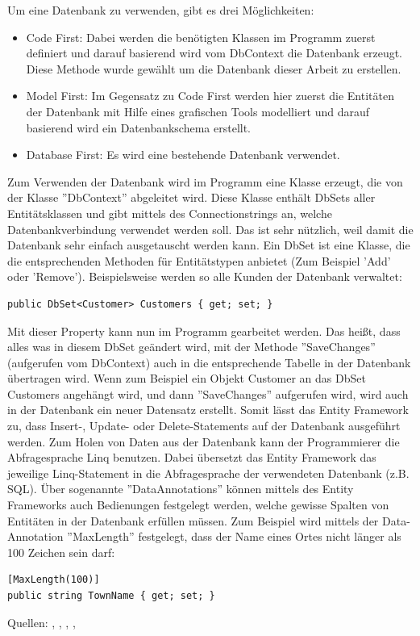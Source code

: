 Um eine Datenbank zu verwenden, gibt es drei Möglichkeiten:
\begin{itemize}
\item Code First: Dabei werden die benötigten Klassen im Programm zuerst definiert und darauf basierend wird vom DbContext die Datenbank erzeugt. Diese Methode wurde gewählt um die Datenbank dieser Arbeit zu erstellen.
\item Model First: Im Gegensatz zu Code First werden hier zuerst die Entitäten der Datenbank mit Hilfe eines grafischen Tools modelliert und darauf basierend wird ein Datenbankschema erstellt.
\item Database First: Es wird eine bestehende Datenbank verwendet.
\end{itemize}
Zum Verwenden der Datenbank wird im Programm eine Klasse erzeugt, die von der Klasse ''DbContext'' abgeleitet wird. Diese Klasse enthält DbSets aller Entitätsklassen und gibt mittels des Connectionstrings an, welche Datenbankverbindung verwendet werden soll. Das ist sehr nützlich, weil damit die Datenbank sehr einfach ausgetauscht werden kann. Ein DbSet ist eine Klasse, die die entsprechenden Methoden für Entitätstypen anbietet (Zum Beispiel 'Add' oder 'Remove'). \newline Beispielsweise werden so alle Kunden der Datenbank verwaltet: 
\begin{lstlisting}
public DbSet<Customer> Customers { get; set; }
\end{lstlisting}
Mit dieser Property kann nun im Programm gearbeitet werden. Das heißt, dass alles was in diesem DbSet geändert wird, mit der Methode ''SaveChanges'' (aufgerufen vom  DbContext) auch in die entsprechende Tabelle in der Datenbank übertragen wird. Wenn zum Beispiel ein Objekt Customer an das DbSet Customers angehängt wird, und dann ''SaveChanges'' aufgerufen wird, wird auch in der Datenbank ein neuer Datensatz erstellt. Somit lässt das Entity Framework zu, dass Insert-, Update- oder Delete-Statements auf der Datenbank ausgeführt werden.
Zum Holen von Daten aus der Datenbank kann der Programmierer die Abfragesprache Linq benutzen. Dabei übersetzt das Entity Framework das jeweilige Linq-Statement in die Abfragesprache der verwendeten Datenbank (z.B. SQL). Über sogenannte ''DataAnnotations'' können mittels des Entity Frameworks auch Bedienungen festgelegt werden, welche gewisse Spalten von Entitäten in der Datenbank erfüllen müssen. Zum Beispiel wird mittels der Data-Annotation ''MaxLength'' festgelegt, dass der Name eines Ortes nicht länger als 100 Zeichen sein darf:
\begin{lstlisting}
[MaxLength(100)]
public string TownName { get; set; }
\end{lstlisting}
Quellen: \cite{wikipedia_entity_2017}, \cite{entityframework_tutorial_what_2018}, \cite{wikipedia_objektrelationale_2016}, \cite{microsoft_entity_connections_2018}, \cite{microsoft_entity_2018}
